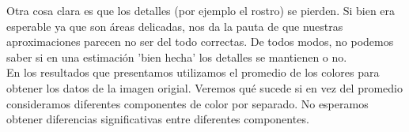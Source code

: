 


Otra cosa clara es que los detalles (por ejemplo el rostro) se pierden. Si bien era esperable ya que son áreas delicadas, nos da la pauta de que nuestras aproximaciones parecen no ser del todo correctas. De todos modos, no podemos saber si en una estimación 'bien hecha' los detalles se mantienen o no. \\


En los resultados que presentamos utilizamos el promedio de los colores para obtener los datos de la imagen origial. Veremos qué sucede si en vez del promedio consideramos diferentes componentes de color por separado. No esperamos obtener diferencias significativas entre diferentes componentes.

